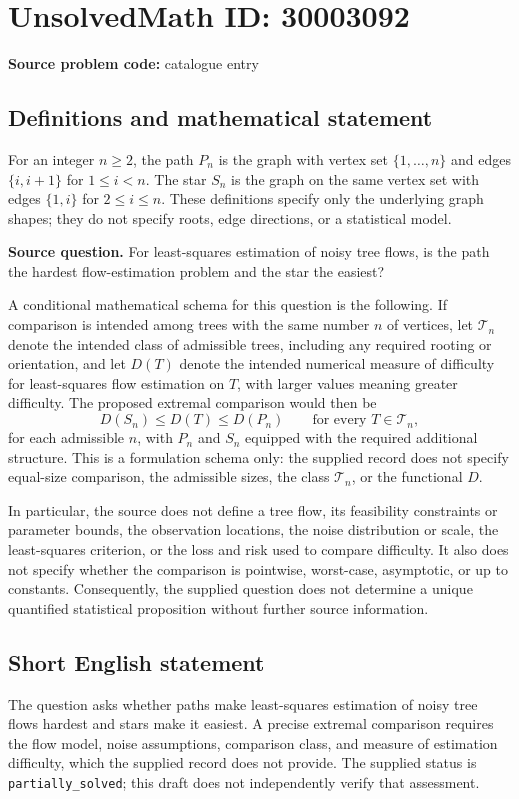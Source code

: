 \documentclass[11pt]{article}
\begin{document}
\section*{UnsolvedMath ID: 30003092}
\textbf{Source problem code:} catalogue entry
\subsection{Definitions and mathematical statement}
For an integer \(n\geq 2\), the path \(P_n\) is the graph with vertex set \(\{1,\ldots,n\}\) and edges \(\{i,i+1\}\) for \(1\leq i<n\). The star \(S_n\) is the graph on the same vertex set with edges \(\{1,i\}\) for \(2\leq i\leq n\). These definitions specify only the underlying graph shapes; they do not specify roots, edge directions, or a statistical model.

\textbf{Source question.} For least-squares estimation of noisy tree flows, is the path the hardest flow-estimation problem and the star the easiest?

A conditional mathematical schema for this question is the following. If comparison is intended among trees with the same number \(n\) of vertices, let \(\mathcal T_n\) denote the intended class of admissible trees, including any required rooting or orientation, and let \(D(T)\) denote the intended numerical measure of difficulty for least-squares flow estimation on \(T\), with larger values meaning greater difficulty. The proposed extremal comparison would then be
\[
D(S_n)\leq D(T)\leq D(P_n)
\qquad\text{for every }T\in\mathcal T_n,
\]
for each admissible \(n\), with \(P_n\) and \(S_n\) equipped with the required additional structure. This is a formulation schema only: the supplied record does not specify equal-size comparison, the admissible sizes, the class \(\mathcal T_n\), or the functional \(D\).

In particular, the source does not define a tree flow, its feasibility constraints or parameter bounds, the observation locations, the noise distribution or scale, the least-squares criterion, or the loss and risk used to compare difficulty. It also does not specify whether the comparison is pointwise, worst-case, asymptotic, or up to constants. Consequently, the supplied question does not determine a unique quantified statistical proposition without further source information.
\subsection{Short English statement}
The question asks whether paths make least-squares estimation of noisy tree flows hardest and stars make it easiest. A precise extremal comparison requires the flow model, noise assumptions, comparison class, and measure of estimation difficulty, which the supplied record does not provide. The supplied status is \texttt{partially\_solved}; this draft does not independently verify that assessment.
\end{document}
